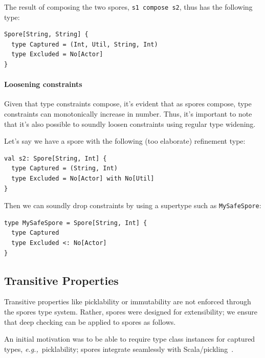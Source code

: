 \documentclass[runningheads]{llncs}
\newcommand{\eg}{{\em e.g.,~}}
\begin{document}
\begin{sloppypar}
\noindent
The result of composing the two spores, \verb|s1 compose s2|, thus has the following type:

\begin{lstlisting}
Spore[String, String] {
  type Captured = (Int, Util, String, Int)
  type Excluded = No[Actor]
}
\end{lstlisting}

\paragraph{\textbf{Loosening constraints}}

Given that type constraints compose, it's evident that as spores compose, type
constraints can monotonically increase in number. Thus, it's important to note
that it's also possible to soundly loosen constraints using regular type
widening.

Let's say we have a spore with the following (too elaborate) refinement type:


\begin{lstlisting}
val s2: Spore[String, Int] {
  type Captured = (String, Int)
  type Excluded = No[Actor] with No[Util]
}
\end{lstlisting}
\noindent
Then we can soundly drop constraints by using a supertype such as \verb|MySafeSpore|:

\begin{lstlisting}
type MySafeSpore = Spore[String, Int] {
  type Captured
  type Excluded <: No[Actor]
}
\end{lstlisting}



\subsection{Transitive Properties}
\label{sec:trans-props}

Transitive properties like picklability or immutability are not enforced
through the spores type system. Rather, spores were designed for extensibility;
we ensure that deep checking can be applied to spores as follows.

An initial motivation was to be able to require type class instances for
captured types, \eg picklability; spores integrate seamlessly with
Scala/pickling~\cite{ScalaPickling}.


\end{sloppypar}
\end{document}
